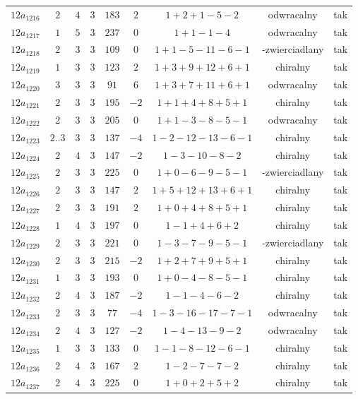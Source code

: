 \begin{longtable}{ccccccccc}
$12a_{1216}$ & $2$ & $4$ & $3$ & $183$ & $2$ & $1+2+1-5-2$ & odwracalny & tak \\
$12a_{1217}$ & $1$ & $5$ & $3$ & $237$ & $0$ & $1+1-1-4$ & odwracalny & tak \\
$12a_{1218}$ & $2$ & $3$ & $3$ & $109$ & $0$ & $1+1-5-11-6-1$ & -zwierciadlany & tak \\
$12a_{1219}$ & $1$ & $3$ & $3$ & $123$ & $2$ & $1+3+9+12+6+1$ & chiralny & tak \\
$12a_{1220}$ & $3$ & $3$ & $3$ & $91$ & $6$ & $1+3+7+11+6+1$ & odwracalny & tak \\
$12a_{1221}$ & $2$ & $3$ & $3$ & $195$ & $-2$ & $1+1+4+8+5+1$ & chiralny & tak \\
$12a_{1222}$ & $2$ & $3$ & $3$ & $205$ & $0$ & $1+1-3-8-5-1$ & odwracalny & tak \\
$12a_{1223}$ & $2..3$ & $3$ & $3$ & $137$ & $-4$ & $1-2-12-13-6-1$ & chiralny & tak \\
$12a_{1224}$ & $2$ & $4$ & $3$ & $147$ & $-2$ & $1-3-10-8-2$ & chiralny & tak \\
$12a_{1225}$ & $2$ & $3$ & $3$ & $225$ & $0$ & $1+0-6-9-5-1$ & -zwierciadlany & tak \\
$12a_{1226}$ & $2$ & $3$ & $3$ & $147$ & $2$ & $1+5+12+13+6+1$ & chiralny & tak \\
$12a_{1227}$ & $2$ & $3$ & $3$ & $191$ & $2$ & $1+0+4+8+5+1$ & chiralny & tak \\
$12a_{1228}$ & $1$ & $4$ & $3$ & $197$ & $0$ & $1-1+4+6+2$ & chiralny & tak \\
$12a_{1229}$ & $2$ & $3$ & $3$ & $221$ & $0$ & $1-3-7-9-5-1$ & -zwierciadlany & tak \\
$12a_{1230}$ & $2$ & $3$ & $3$ & $215$ & $-2$ & $1+2+7+9+5+1$ & chiralny & tak \\
$12a_{1231}$ & $1$ & $3$ & $3$ & $193$ & $0$ & $1+0-4-8-5-1$ & chiralny & tak \\
$12a_{1232}$ & $2$ & $4$ & $3$ & $187$ & $-2$ & $1-1-4-6-2$ & chiralny & tak \\
$12a_{1233}$ & $2$ & $3$ & $3$ & $77$ & $-4$ & $1-3-16-17-7-1$ & odwracalny & tak \\
$12a_{1234}$ & $2$ & $4$ & $3$ & $127$ & $-2$ & $1-4-13-9-2$ & odwracalny & tak \\
$12a_{1235}$ & $1$ & $3$ & $3$ & $133$ & $0$ & $1-1-8-12-6-1$ & chiralny & tak \\
$12a_{1236}$ & $2$ & $4$ & $3$ & $167$ & $2$ & $1-2-7-7-2$ & chiralny & tak \\
$12a_{1237}$ & $2$ & $4$ & $3$ & $225$ & $0$ & $1+0+2+5+2$ & chiralny & tak \\

\end{longtable}
